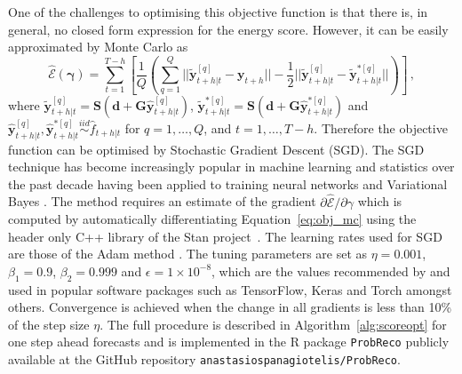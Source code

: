 \documentclass[12pt]{article}
\theoremstyle{definition}
\begin{document}
One of the challenges to optimising this objective function is that there is, in general, no closed form expression for the energy score.  However, it can be easily approximated by Monte Carlo as
\begin{equation*}
\hat{\mathcal{E}}\left(\bm{\gamma}\right)=\sum\limits_{t=1}^{T-h}\left[\frac{1}{Q}\left(\sum\limits_{q=1}^{Q}||\tilde{\bm{y}}^{[q]}_{t+h|t}-\bm{y}_{t+h}||-\frac{1}{2}||\tilde{\bm{y}}_{t+h|t}^{[q]}-\tilde{\bm{y}}^{*[q]}_{t+h|t}||\right)\right]\,,
\label{eq:obj_mc}
\end{equation*} 
where $\tilde{\bm{y}}^{[q]}_{t+h|t}=\bm{S}\left(\bm{d}+\bm{G}{\hat{\bm{y}}}^{[q]}_{t+h|t}\right)$, $\tilde{\bm{y}}^{*[q]}_{t+h|t}=\bm{S}\left(\bm{d}+\bm{G}{\hat{\bm{y}}}^{*[q]}_{t+h|t}\right)$ and ${\hat{\bm{y}}}^{[q]}_{t+h|t},{\hat{\bm{y}}}^{*[q]}_{t+h|t}\overset{iid}{\sim} \hat{f}_{t+h|t}$ for $q=1,\ldots,Q$, and $t=1,\ldots,T-h$.  Therefore the objective function can be optimised by Stochastic Gradient Descent (SGD). The SGD technique has become increasingly popular in machine learning and statistics over the past decade having been applied to training neural networks \citep{bottou2010} and Variational Bayes \citep{kingma2013}.  The method requires an estimate of the gradient $\partial\hat{\mathcal{E}}/\partial{\gamma}$ which is computed by automatically differentiating Equation~\ref{eq:obj_mc} using the header only C++ library of the Stan project~\citep{carpenter2015}.  The learning rates used for SGD are those of the Adam method \citep[see][for details]{kingma2014}.  The tuning parameters are set as $\eta=0.001$, $\beta_1=0.9$, $\beta_2=0.999$ and $\epsilon=1\times 10^{-8}$, which are the values recommended by \cite{kingma2014} and used in popular software packages such as TensorFlow, Keras and Torch amongst others.  Convergence is achieved when the change in all gradients is less than 10\% of the step size $\eta$.  The full procedure is described in Algorithm~\ref{alg:scoreopt} for one step ahead forecasts and is implemented in the R package \texttt{ProbReco} publicly available at the GitHub repository \texttt{anastasiospanagiotelis/ProbReco}.
\end{document}
